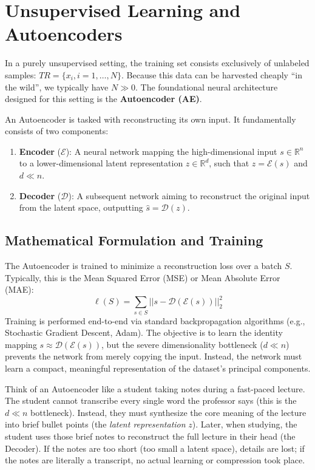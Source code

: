 \section{Unsupervised Learning and Autoencoders}
\label{sec:autoencoders}

In a purely unsupervised setting, the training set consists exclusively of unlabeled samples: $TR = \{x_i, i=1, \dots, N\}$. Because this data can be harvested cheaply ``in the wild'', we typically have $N \gg 0$. The foundational neural architecture designed for this setting is the \textbf{Autoencoder (AE)}.

An Autoencoder is tasked with reconstructing its own input. It fundamentally consists of two components:
\begin{enumerate}
    \item \textbf{Encoder} ($\mathcal{E}$): A neural network mapping the high-dimensional input $s \in \mathbb{R}^n$ to a lower-dimensional latent representation $z \in \mathbb{R}^d$, such that $z = \mathcal{E}(s)$ and $d \ll n$.
    \item \textbf{Decoder} ($\mathcal{D}$): A subsequent network aiming to reconstruct the original input from the latent space, outputting $\hat{s} = \mathcal{D}(z)$.
\end{enumerate}

\subsection{Mathematical Formulation and Training}
The Autoencoder is trained to minimize a reconstruction loss over a batch $S$. Typically, this is the Mean Squared Error (MSE) or Mean Absolute Error (MAE):
\begin{equation}
    \ell(S) = \sum_{s \in S} ||s - \mathcal{D}(\mathcal{E}(s))||_2^2
\end{equation}
Training is performed end-to-end via standard backpropagation algorithms (e.g., Stochastic Gradient Descent, Adam). The objective is to learn the identity mapping $s \approx \mathcal{D}(\mathcal{E}(s))$, but the severe dimensionality bottleneck ($d \ll n$) prevents the network from merely copying the input. Instead, the network must learn a compact, meaningful representation of the dataset's principal components.

\begin{insightbox}
Think of an Autoencoder like a student taking notes during a fast-paced lecture. The student cannot transcribe every single word the professor says (this is the $d \ll n$ bottleneck). Instead, they must synthesize the core meaning of the lecture into brief bullet points (the \textit{latent representation} $z$). Later, when studying, the student uses those brief notes to reconstruct the full lecture in their head (the Decoder). If the notes are too short (too small a latent space), details are lost; if the notes are literally a transcript, no actual learning or compression took place.
\end{insightbox}

